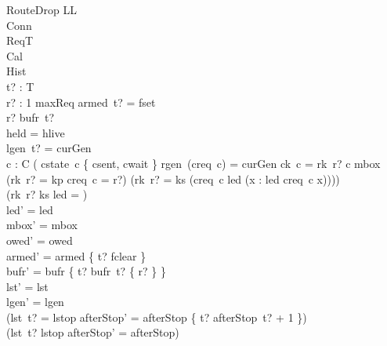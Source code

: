 \documentclass[a4paper,10pt,fleqn]{article}
\begin{document}
\begin{schema}{RouteDrop}
  \Delta LL \\
  \Xi Conn \\
  \Xi ReqT \\
  \Xi Cal \\
  \Xi Hist \\
  t? : T \\
  r? : 1 \upto maxReq
\where
  armed~t? = fset \\
  r? \in bufr~t? \\
  held = hlive \\
  lgen~t? = curGen \\
  \forall c : C \spot \lnot ( cstate~c \in \{ csent, cwait \}
    \land rgen~(creq~c) = curGen \land ck~c = rk~r? \land c \notin \dom mbox
    \land (rk~r? = kp \implies creq~c = r?)
    \land (rk~r? = ks \implies
      (creq~c \in led \land (\forall x : led \spot creq~c \leq x)))) \\
  (rk~r? \neq ks \lor led = \emptyset) \\
  led' = led \\
  mbox' = mbox \\
  owed' = owed \\
  armed' = armed \oplus \{ t? \mapsto fclear \} \\
  bufr' = bufr \oplus \{ t? \mapsto bufr~t? \setminus \{ r? \} \} \\
  lst' = lst \\
  lgen' = lgen \\
  (lst~t? = lstop \implies
    afterStop' = afterStop \oplus \{ t? \mapsto afterStop~t? + 1 \}) \\
  (lst~t? \neq lstop \implies afterStop' = afterStop)
\end{schema}
\end{document}

